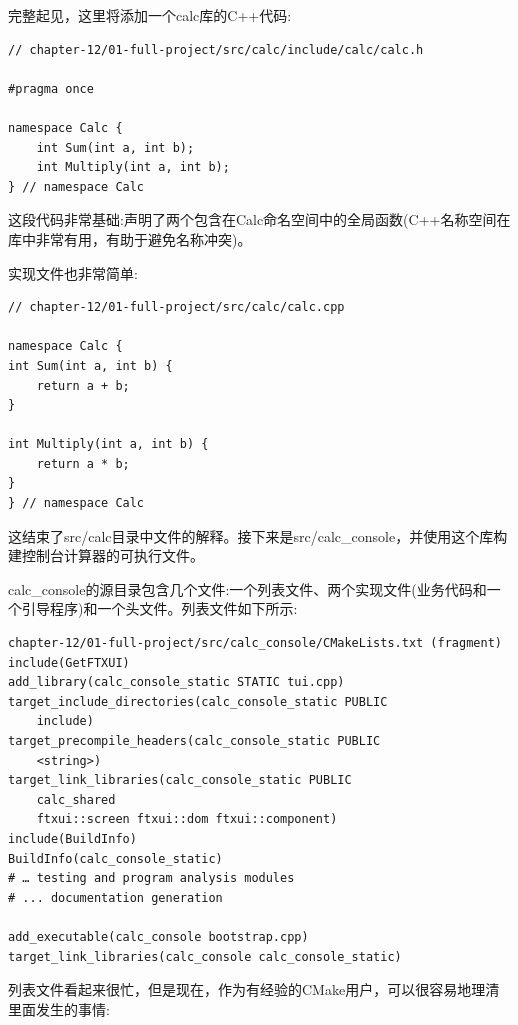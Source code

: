 完整起见，这里将添加一个calc库的C++代码:

\begin{lstlisting}[style=styleCXX]
// chapter-12/01-full-project/src/calc/include/calc/calc.h

#pragma once

namespace Calc {
	int Sum(int a, int b);
	int Multiply(int a, int b);
} // namespace Calc
\end{lstlisting}

这段代码非常基础:声明了两个包含在Calc命名空间中的全局函数(C++名称空间在库中非常有用，有助于避免名称冲突)。

实现文件也非常简单:

\begin{lstlisting}[style=styleCXX]
// chapter-12/01-full-project/src/calc/calc.cpp

namespace Calc {
int Sum(int a, int b) {
	return a + b;
}

int Multiply(int a, int b) {
	return a * b;
}
} // namespace Calc
\end{lstlisting}

这结束了src/calc目录中文件的解释。接下来是src/calc\_console，并使用这个库构建控制台计算器的可执行文件。


calc\_console的源目录包含几个文件:一个列表文件、两个实现文件(业务代码和一个引导程序)和一个头文件。列表文件如下所示:

\begin{lstlisting}[style=styleCMake]
chapter-12/01-full-project/src/calc_console/CMakeLists.txt (fragment)
include(GetFTXUI)
add_library(calc_console_static STATIC tui.cpp)
target_include_directories(calc_console_static PUBLIC
	include)
target_precompile_headers(calc_console_static PUBLIC
	<string>)
target_link_libraries(calc_console_static PUBLIC
	calc_shared
	ftxui::screen ftxui::dom ftxui::component)
include(BuildInfo)
BuildInfo(calc_console_static)
# … testing and program analysis modules
# ... documentation generation

add_executable(calc_console bootstrap.cpp)
target_link_libraries(calc_console calc_console_static)
\end{lstlisting}

列表文件看起来很忙，但是现在，作为有经验的CMake用户，可以很容易地理清里面发生的事情:

